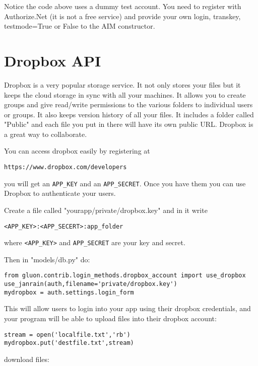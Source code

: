\documentclass[justified,sixbynine,notoc]{tufte-book}
\def\ft{\small\tt}
\def\inxx#1{\index{#1}}
\begin{document}
\begin{fullwidth}
Notice the code above uses a dummy test account. You need to register with Authorize.Net (it is not a free service) and provide your own login, transkey, testmode=True or False to the AIM constructor.

\goodbreak\section{Dropbox API}

\inxx{Dropbox.com}

Dropbox is a very popular storage service. It not only stores your files but it keeps the cloud storage in sync with all your machines. It allows you to create groups and give read/write permissions to the various folders to individual users or groups. It also keeps version history of all your files. It includes a folder called "Public" and each file you put in there will have its own public URL. Dropbox is a great way to collaborate.

You can access dropbox easily by registering at

\begin{lstlisting}[keywords={}]
https://www.dropbox.com/developers
\end{lstlisting}
\noindent you will get an {\ft APP\_KEY} and an {\ft APP\_SECRET}. Once you have them you can use Dropbox to authenticate your users.

Create a file called "yourapp/private/dropbox.key" and in it write
\begin{lstlisting}[keywords={}]
<APP_KEY>:<APP_SECERT>:app_folder
\end{lstlisting}
where {\ft <APP\_KEY>} and {\ft APP\_SECRET} are your key and secret.

Then in "models/db.py" do:

\begin{lstlisting}
from gluon.contrib.login_methods.dropbox_account import use_dropbox
use_janrain(auth,filename='private/dropbox.key')
mydropbox = auth.settings.login_form
\end{lstlisting}

This will allow users to login into your app using their dropbox credentials, and your program will be able to upload files into their dropbox account:

\begin{lstlisting}
stream = open('localfile.txt','rb')
mydropbox.put('destfile.txt',stream)
\end{lstlisting}
\noindent download files:


\end{fullwidth}
\end{document}
